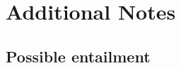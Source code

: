 \documentclass[10pt]{article}
\newcommand{\hozlinedash}[0]{%
  \noindent\hdashrule[0.5ex][c]{\textwidth}{.1pt}{2.5pt}
}
\begin{document}

\newpage


\printbibliography












\newpage

\section{Additional Notes}
\label{sec:additional-notes}


\subsection{Possible entailment}
\label{sec:possible-entailment}
\end{document}
